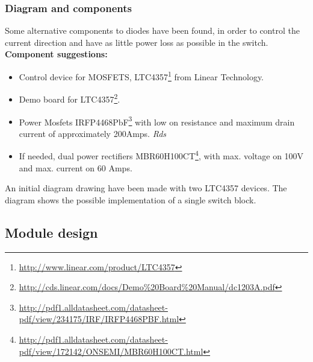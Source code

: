 \subsubsection{Diagram and components}
Some alternative components to diodes have been found, in order to control the current direction and have as little power loss as possible in the switch. 
\textbf{Component suggestions:}
\begin{itemize}
	\item Control device for MOSFETS, LTC4357\footnote{\url{http://www.linear.com/product/LTC4357}} from Linear Technology.
	\item Demo board for LTC4357\footnote{\url{http://cds.linear.com/docs/Demo\%20Board\%20Manual/dc1203A.pdf}}.
	\item Power Mosfets IRFP4468PbF\footnote{\url{http://pdf1.alldatasheet.com/datasheet-pdf/view/234175/IRF/IRFP4468PBF.html}} with low on resistance and maximum drain current of approximately 200Amps. \textit{Rds}
	\item If needed, dual power rectifiers MBR60H100CT\footnote{\url{http://pdf1.alldatasheet.com/datasheet-pdf/view/172142/ONSEMI/MBR60H100CT.html}}, with max. voltage on 100V and max. current on 60 Amps.
\end{itemize}
An initial diagram drawing have been made with two LTC4357 devices. The diagram shows the possible implementation of a single switch block.


\subsection{Module design}


